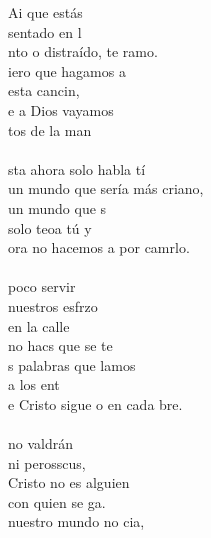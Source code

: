 \begin{cancion}%
	Ai que estás \\
	sentado en l     \\
	nto o distraído, te ramo.\\
	iero que hagamos a \\
	esta cancin,\\
	e a Dios vayamos \\
	tos de la man\\
	\jump\\
	sta ahora solo habla tí\\
	un mundo que sería más criano,\\
	 un mundo que s  \\
	solo teoa tú y \\
	ora no hacemos a por camrlo.\\
	\jump\\
	 poco servir \\
	nuestros esfrzo\\
	en la calle \\
	no hacs que se te\\
	s palabras que lamos \\
	a los ent\\
	e Cristo sigue o en cada bre.\\
	\jump\\
	 no valdrán \\
	ni perosscus, \\
	 Cristo no es alguien \\
	con quien se ga.\\
	 nuestro mundo no cia, \\

\end{cancion}
